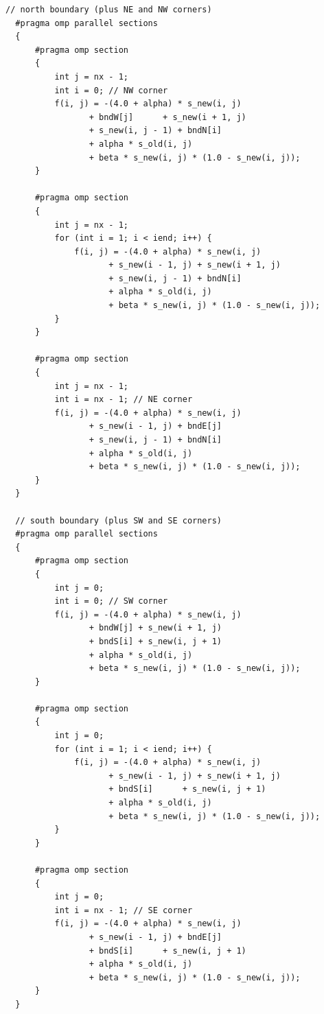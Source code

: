 \documentclass[unicode,11pt,a4paper,oneside,numbers=endperiod,openany]{scrartcl}
\begin{document}
\begin{lstlisting}[language=MyC++, style=mystyle, caption={Parallelized North and South Boundaries Calculation with Sections}]
  // north boundary (plus NE and NW corners)
  #pragma omp parallel sections
  {
      #pragma omp section
      {
          int j = nx - 1;
          int i = 0; // NW corner
          f(i, j) = -(4.0 + alpha) * s_new(i, j)
                 + bndW[j]      + s_new(i + 1, j)
                 + s_new(i, j - 1) + bndN[i]
                 + alpha * s_old(i, j)
                 + beta * s_new(i, j) * (1.0 - s_new(i, j));
      }

      #pragma omp section
      {
          int j = nx - 1;
          for (int i = 1; i < iend; i++) {
              f(i, j) = -(4.0 + alpha) * s_new(i, j)
                     + s_new(i - 1, j) + s_new(i + 1, j)
                     + s_new(i, j - 1) + bndN[i]
                     + alpha * s_old(i, j)
                     + beta * s_new(i, j) * (1.0 - s_new(i, j));
          }
      }

      #pragma omp section
      {
          int j = nx - 1;
          int i = nx - 1; // NE corner
          f(i, j) = -(4.0 + alpha) * s_new(i, j)
                 + s_new(i - 1, j) + bndE[j]
                 + s_new(i, j - 1) + bndN[i]
                 + alpha * s_old(i, j)
                 + beta * s_new(i, j) * (1.0 - s_new(i, j));
      }
  }

  // south boundary (plus SW and SE corners)
  #pragma omp parallel sections
  {
      #pragma omp section
      {
          int j = 0;
          int i = 0; // SW corner
          f(i, j) = -(4.0 + alpha) * s_new(i, j)
                 + bndW[j] + s_new(i + 1, j)
                 + bndS[i] + s_new(i, j + 1)
                 + alpha * s_old(i, j)
                 + beta * s_new(i, j) * (1.0 - s_new(i, j));
      }

      #pragma omp section
      {
          int j = 0;
          for (int i = 1; i < iend; i++) {
              f(i, j) = -(4.0 + alpha) * s_new(i, j)
                     + s_new(i - 1, j) + s_new(i + 1, j)
                     + bndS[i]      + s_new(i, j + 1)
                     + alpha * s_old(i, j)
                     + beta * s_new(i, j) * (1.0 - s_new(i, j));
          }
      }

      #pragma omp section
      {
          int j = 0;
          int i = nx - 1; // SE corner
          f(i, j) = -(4.0 + alpha) * s_new(i, j)
                 + s_new(i - 1, j) + bndE[j]
                 + bndS[i]      + s_new(i, j + 1)
                 + alpha * s_old(i, j)
                 + beta * s_new(i, j) * (1.0 - s_new(i, j));
      }
  }
\end{lstlisting}
\end{document}
